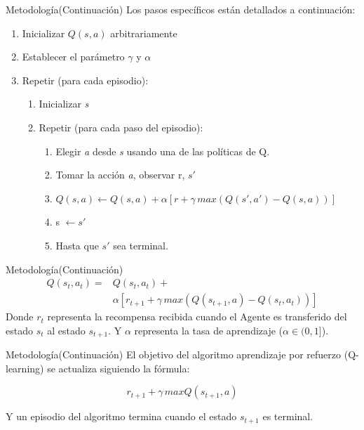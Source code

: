 \documentclass{beamer}
\begin{document}
\begin{frame}{Metodología}{(Continuación)}
	Los pasos específicos están detallados a continuación:
	
	\begin{enumerate}
		\item Inicializar $Q(s,a)$ arbitrariamente
		\item Establecer el parámetro $\gamma$ y $\alpha$
		\item Repetir (para cada episodio):
		\begin{enumerate}[1]
			\item Inicializar \textit{s}
			\item Repetir (para cada paso del episodio):
			\begin{enumerate}[2.1]
				\item Elegir \textit{a} desde \textit{s} usando una de las políticas de Q.
				\item Tomar la acción \textit{a}, observar r, $s'$
				\item $	\displaystyle	Q(s,a) \leftarrow Q(s,a) + \alpha[r + \gamma \, max(Q(s',a') - Q(s,a) )] $
				\item s $\leftarrow s'$ 
				\item Hasta que $s'$ sea terminal.
			\end{enumerate}
		\end{enumerate}
	\end{enumerate}
\end{frame}

\begin{frame}{Metodología}{(Continuación)}
    \begin{equation}
    	\begin{split}
    		\displaystyle	Q(s_t,a_t)  = &Q(s_t,a_t) + \\ & \alpha[r_{t+1} + \gamma \, max(Q(s_{t+1},a) - Q(s_t,a_t) )] \label{eq:1}
    	\end{split}
    \end{equation}
    Donde $r_t$ representa la recompensa recibida cuando el Agente es transferido del estado $s_{t}$ al estado $s_{t+1}$. Y $\alpha$ representa la tasa de aprendizaje ($\alpha \in (0,1]$).
    
\end{frame}

\begin{frame}{Metodología}{(Continuación)}
    El objetivo del algoritmo aprendizaje por refuerzo (Q-learning) se actualiza siguiendo la fórmula:
    
    \begin{equation}
    	r_{t+1} + \gamma \, max Q(s_{t+1},a)
    \end{equation} 

Y un episodio del algoritmo termina cuando el estado $s_{t+1}$ es terminal.

\end{frame}
\end{document}
